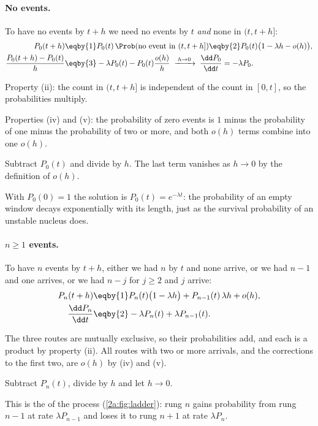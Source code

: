 \paragraph{No events.} To have no events by $t+h$ we need no events by $t$ \emph{and} none in $(t,t+h]$:
\begin{align*}
  P_0(t+h) &\eqby{1} P_0(t)\,\Prob(\text{no event in }(t,t+h]) \eqby{2} P_0(t)\bigl(1-\lambda h-o(h)\bigr),\\
  \frac{P_0(t+h)-P_0(t)}{h} &\eqby{3} -\lambda P_0(t)-P_0(t)\frac{o(h)}{h}
  \;\xrightarrow{\;h\to0\;}\; \frac{\dd P_0}{\dd t}=-\lambda P_0 .
\end{align*}
\begin{explain}
  \item Property (ii): the count in $(t,t+h]$ is independent of the count in $[0,t]$, so the probabilities multiply.
  \item Properties (iv) and (v): the probability of zero events is $1$ minus the probability of one minus the probability of two or more, and both $o(h)$ terms combine into one $o(h)$.
  \item Subtract $P_0(t)$ and divide by $h$. The last term vanishes as $h\to0$ by the definition of $o(h)$.
\end{explain}
With $P_0(0)=1$ the solution is $P_0(t)=e^{-\lambda t}$: the probability of an empty window decays exponentially with its length, just as the survival probability of an unstable nucleus does.

\paragraph{$n\ge1$ events.} To have $n$ events by $t+h$, either we had $n$ by $t$ and none arrive, or we had $n-1$ and one arrives, or we had $n-j$ for $j\ge2$ and $j$ arrive:
\begin{align*}
  P_n(t+h) &\eqby{1} P_n(t)\bigl(1-\lambda h\bigr)+P_{n-1}(t)\,\lambda h+o(h),\\
  \frac{\dd P_n}{\dd t} &\eqby{2} -\lambda P_n(t)+\lambda P_{n-1}(t) .
\end{align*}
\begin{explain}
  \item The three routes are mutually exclusive, so their probabilities add, and each is a product by property (ii). All routes with two or more arrivals, and the corrections to the first two, are $o(h)$ by (iv) and (v).
  \item Subtract $P_n(t)$, divide by $h$ and let $h\to0$.
\end{explain}
This is the  of the process (\cref{2a:fig:ladder}): rung $n$ gains probability from rung $n-1$ at rate $\lambda P_{n-1}$ and loses it to rung $n+1$ at rate $\lambda P_n$.

